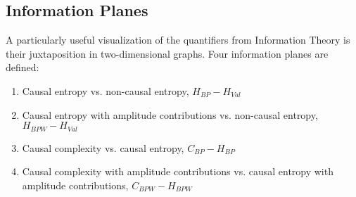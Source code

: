 \subsection{Information Planes}

A particularly useful visualization of the quantifiers from Information Theory is their juxtaposition in two-dimensional graphs.
Four information planes are defined:
\begin{enumerate}
	\item Causal entropy vs. non-causal entropy, $H_{BP} - H_{Val}$
	\item Causal entropy with amplitude contributions vs. non-causal entropy, $H_{BPW} - H_{Val}$
	\item Causal complexity vs. causal entropy, $C_{BP} - H_{BP}$
	\item Causal complexity with amplitude contributions vs. causal entropy with amplitude contributions, $C_{BPW} - H_{BPW}$
\end{enumerate}

